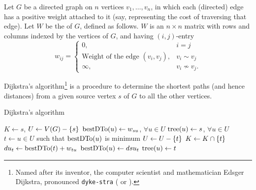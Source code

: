 Let $G$ be a directed graph on $n$ vertices $v_1, \ldots, v_n$, in which each (directed) edge has a positive weight attached to it (say, representing the cost of traversing that edge). Let $W$ be the  of $G$, defined as follows. $W$ is an $n \times n$ matrix with rows and columns indexed by the vertices of $G$, and having $(i,j)$-entry
\begin{equation*}
w_{ij} = \begin{cases}
0, & i = j\\
\text{Weight of the edge $(v_i, v_j)$}, & v_i \sim v_j\\
\infty, & v_i \not\sim v_j.
\end{cases}
\end{equation*}

Dijkstra's algorithm\footnote{Named after its inventor, the computer scientist and mathematician Edsger Dijkstra, pronounced \texttt{dyke-stra} ( or ).} is a procedure to determine the shortest paths (and hence distances) from a given source vertex $s$ of $G$ to all the other vertices. 

\begin{algorithm}\caption{Dijkstra's algorithm}\label{alg:Dijkstra}
\begin{algorithmic}[1]
	\State $K \gets {s}$, $U \gets V(G) - \qty{s}$
	\State $\operatorname{bestDTo}(u) \gets w_{su}$, $\forall u \in U$
	\State $\operatorname{tree}(u) \gets s$, $\forall u \in U$
		\State $t \gets u \in U$ such that $\operatorname{bestDTo}(u)$ is minimum
		\State $U \gets U - \qty{t}$ 
		\State $K \gets K \cap \qty{t}$ 
			\State $du_t \gets \operatorname{bestDTo}(t) + w_{tu}$ 
				\State $\operatorname{bestDTo}(u) \gets dsu_t$
				\State $\operatorname{tree}(u) \gets t$
			\EndIf
		\EndFor
	\EndWhile
\end{algorithmic}
\end{algorithm}


